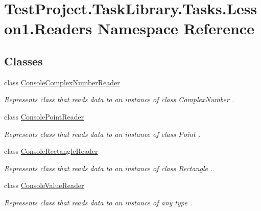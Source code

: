\hypertarget{namespace_test_project_1_1_task_library_1_1_tasks_1_1_lesson1_1_1_readers}{}\section{Test\+Project.\+Task\+Library.\+Tasks.\+Lesson1.\+Readers Namespace Reference}
\label{namespace_test_project_1_1_task_library_1_1_tasks_1_1_lesson1_1_1_readers}
\subsection*{Classes}
\begin{DoxyCompactItemize}
\item 
class \mbox{\hyperlink{class_test_project_1_1_task_library_1_1_tasks_1_1_lesson1_1_1_readers_1_1_console_complex_number_reader}{Console\+Complex\+Number\+Reader}}
\begin{DoxyCompactList}\small\item\em Represents class that reads data to an instance of class Complex\+Number . \end{DoxyCompactList}\item 
class \mbox{\hyperlink{class_test_project_1_1_task_library_1_1_tasks_1_1_lesson1_1_1_readers_1_1_console_point_reader}{Console\+Point\+Reader}}
\begin{DoxyCompactList}\small\item\em Represents class that reads data to an instance of class Point . \end{DoxyCompactList}\item 
class \mbox{\hyperlink{class_test_project_1_1_task_library_1_1_tasks_1_1_lesson1_1_1_readers_1_1_console_rectangle_reader}{Console\+Rectangle\+Reader}}
\begin{DoxyCompactList}\small\item\em Represents class that reads data to an instance of class Rectangle . \end{DoxyCompactList}\item 
class \mbox{\hyperlink{class_test_project_1_1_task_library_1_1_tasks_1_1_lesson1_1_1_readers_1_1_console_value_reader}{Console\+Value\+Reader}}
\begin{DoxyCompactList}\small\item\em Represents class that reads data to an instance of any type . \end{DoxyCompactList}\end{DoxyCompactItemize}
